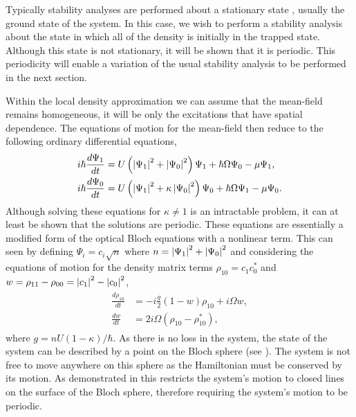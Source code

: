 Typically stability analyses are performed about a stationary state \cite{Ho:1998,Robins:2001kx}, usually the ground state of the system. In this case, we wish to perform a stability analysis about the state in which all of the density is initially in the trapped state. Although this state is not stationary, it will be shown that it is periodic. This periodicity will enable a variation of the usual stability analysis to be performed in the next section.

Within the local density approximation we can assume that the mean-field remains homogeneous, it will be only the excitations that have spatial dependence. The equations of motion for the mean-field then reduce to the following ordinary differential equations,
\begin{align}
    \begin{split}
        i \hbar \frac{d \Psi_1}{dt} &= U\left(\abs{\Psi_1}^2 + \abs{\Psi_0}^2\right)\Psi_1 + \hbar \Omega \Psi_0 - \mu \Psi_1,\\
        i \hbar \frac{d \Psi_0}{dt} &= U\left(\abs{\Psi_1}^2 + \kappa \abs{\Psi_0}^2\right)\Psi_0 + \hbar \Omega \Psi_1 - \mu \Psi_0.
    \end{split}
    \label{Peaks:MeanFieldEquationsOfMotion}
\end{align}
Although solving these equations for $\kappa \neq 1$ is an intractable problem, it can at least be shown that the solutions are periodic. These equations are essentially a modified form of the optical Bloch equations with a nonlinear term. This can seen by defining $\Psi_i = c_i\sqrt{n}$ where $n = \left|\Psi_1\right|^2 + \left|\Psi_0\right|^2$ and considering the equations of motion for the density matrix terms $\rho_{10} = c_{1}^{}c_{0}^*$ and $w = \rho_{11}-\rho_{00} = \left|c_1\right|^2 - \left|c_0\right|^2$,
\begin{align}
    \begin{split}
        \frac{d\rho_{10}}{dt} &= -i\frac{g}{2} (1-w)\rho_{10} + i \Omega w,\\
        \frac{d w}{dt} &= 2 i \Omega \left(\rho_{10}^{} - \rho_{10}^*\right),
    \end{split}
    \label{Peaks:OpticalBlochEquations}
\end{align}
where $g = n U (1-\kappa)/\hbar$. As there is no loss in the system, the state of the system can be described by a point on the Bloch sphere (see ).  The system is not free to move anywhere on this sphere as the Hamiltonian must be conserved by its motion.  As demonstrated in  this restricts the system's motion to closed lines on the surface of the Bloch sphere, therefore requiring the system's motion to be periodic.

